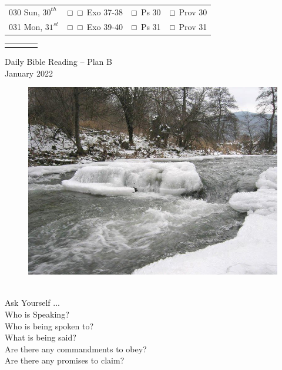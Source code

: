 \documentclass[10pt,landscape,twocolumn,letterpaper]{article}
\begin{document}
\begin{tabular}{p{0.8in}p{1.3in}p{1.2in}p{1.2in}}
\tiny 030 \normalsize Sun, $30^{th}$ &   $\boxempty$ $\boxempty$  \hspace{.20in} \textcolor[rgb]{1.00,0.00,0.00}{Exo 37-38} & $\boxempty$ \hspace{.05in} \textcolor[rgb]{0.00,1.00,0.00}{Ps 30} & $\boxempty$ \hspace{.05in} \textcolor[rgb]{0.00,0.00,1.00}{Prov 30}  \\

\tiny 031 \normalsize Mon, $31^{st}$ &   $\boxempty$ $\boxempty$  \hspace{.20in} \textcolor[rgb]{1.00,0.00,0.00}{Exo 39-40} & $\boxempty$ \hspace{.05in} \textcolor[rgb]{0.00,1.00,0.00}{Ps 31} & $\boxempty$ \hspace{.05in} \textcolor[rgb]{0.00,0.00,1.00}{Prov 31}  \\

\end{tabular} 
\newpage

\begin{tabular}{p{0.8in}p{1.3in}p{1.2in}p{1.2in}}
& & & \\
\end{tabular}
\newpage

\LARGE
\begin{center}
\textcolor[rgb]{0.98,0.00,0.00}{Daily Bible Reading -- Plan B}\\
\textcolor[rgb]{0.00,0.00,1.00}{January 2022}\\
\end{center}


\begin{figure}[htp]
	\centering
	\includegraphics[width=4.5in]{January}\\
\end{figure}

\begin{center}
\textcolor[rgb]{0.00,0.00,1.00}{\\Ask Yourself ...}
\textcolor[rgb]{1.00,0.00,0.00}{\\Who is Speaking?\\Who is being spoken to?\\What is being said?\\Are there
any commandments to obey?\\Are there any promises to claim?}
\end{center}
\end{document}

